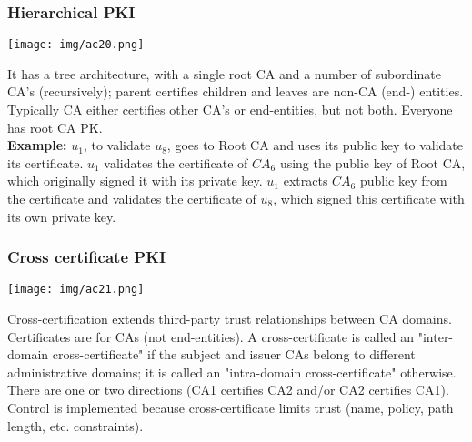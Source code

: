 \documentclass[a4paper, 10pt, titlepage]{article}
\begin{document}
\subsubsection*{Hierarchical PKI}
\begin{center}
\texttt{[image: img/ac20.png]}
\end{center}
It has a tree architecture, with a single root CA and a number of subordinate CA’s (recursively); parent certifies children and leaves are non-CA (end-) entities.
Typically CA either certifies other CA’s or end-entities, but not both. Everyone has root CA PK. \medskip\\
\textbf{Example: }$u_1$, to validate $u_8$, goes to Root CA and uses its public key to validate its certificate. $u_1$ validates the certificate of $CA_6$ using the public key of Root CA, which originally signed it with its private key. $u_1$ extracts $CA_6$ public key from the certificate and validates the certificate of $u_8$, which signed this certificate with its own private key.

\subsubsection*{Cross certificate PKI}
\begin{center}
\texttt{[image: img/ac21.png]}
\end{center}
Cross-certification extends third-party trust relationships between CA domains. Certificates are for CAs (not end-entities).  A cross-certificate is called an "inter-domain cross-certificate" if the subject and issuer CAs belong to different administrative domains; it is called an "intra-domain cross-certificate" otherwise.
There are one or two directions (CA1 certifies CA2 and/or CA2 certifies CA1). Control is implemented because cross-certificate limits trust (name, policy, path length, etc. constraints).
\end{document}
